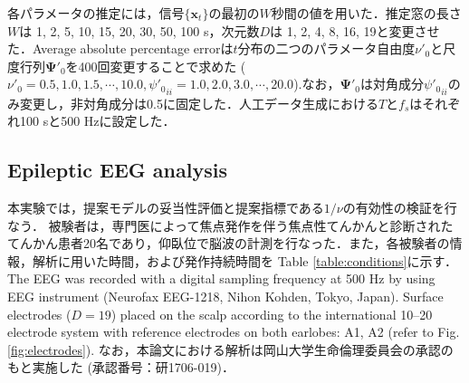 \documentclass[journal]{IEEEtran}
\begin{document}
各パラメータの推定には，信号$\{\mathbf{x}_t \}$の最初の$W$秒間の値を用いた．推定窓の長さ$W$は 1, 2, 5, 10, 15, 20, 30, 50, 100 s，次元数$D$は 1, 2, 4, 8, 16, 19と変更させた．Average absolute percentage errorは$t$分布の二つのパラメータ自由度$\nu'_0$と尺度行列$\mathbf{\Psi}'_0$を400回変更することで求めた ($\nu'_0=0.5,1.0,1.5,\cdots,10.0, {\psi'_0}_{ii} =1.0, 2.0, 3.0,\cdots, 20.0$).なお，$\mathbf{\Psi}'_0$は対角成分${\psi'_0}_{ii}$のみ変更し，非対角成分は0.5に固定した．人工データ生成における$T$と$f_s$はそれぞれ100 sと500 Hzに設定した．

\subsection{Epileptic EEG analysis}
本実験では，提案モデルの妥当性評価と提案指標である$1/\nu$の有効性の検証を行なう．
被験者は，専門医によって焦点発作を伴う焦点性てんかんと診断されたてんかん患者20名であり，仰臥位で脳波の計測を行なった．また，各被験者の情報，解析に用いた時間，および発作持続時間を Table \ref{table:conditions}に示す．The EEG was recorded with a digital sampling frequency at 500 Hz by using EEG instrument (Neurofax EEG-1218, Nihon Kohden, Tokyo, Japan). Surface electrodes ($D=19$) placed on the scalp according to the international 10--20 electrode system with reference electrodes on both earlobes: A1, A2 (refer to Fig. \ref{fig:electrodes}).
なお，本論文における解析は岡山大学生命倫理委員会の承認のもと実施した (承認番号：研1706-019)．
\end{document}
